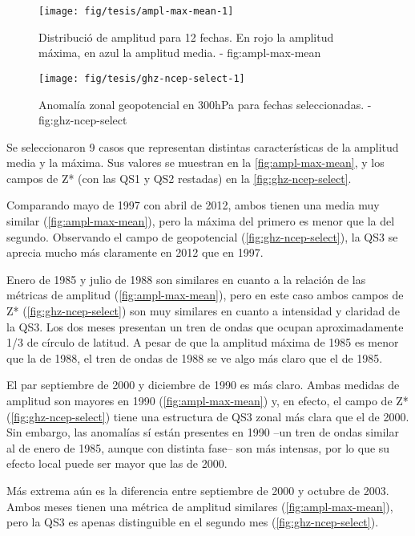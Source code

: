 \documentclass[spanish,a4paper]{book}
\begin{document}
\begin{figure*}
\texttt{[image: fig/tesis/ampl-max-mean-1]} \caption{Distribució de amplitud para 12 fechas. En rojo la amplitud máxima, en azul la amplitud media. - fig:ampl-max-mean}\label{fig:ampl-max-mean}
\end{figure*}

\begin{figure*}
\texttt{[image: fig/tesis/ghz-ncep-select-1]} \caption{Anomalía zonal geopotencial en 300hPa para fechas seleccionadas. - fig:ghz-ncep-select}\label{fig:ghz-ncep-select}
\end{figure*}

Se seleccionaron 9 casos que representan distintas características de la
amplitud media y la máxima. Sus valores se muestran en la
\autoref{fig:ampl-max-mean}, y los campos de Z* (con las QS1 y QS2
restadas) en la \autoref{fig:ghz-ncep-select}.

Comparando mayo de 1997 con abril de 2012, ambos tienen una media muy
similar (\autoref{fig:ampl-max-mean}), pero la máxima del primero es
menor que la del segundo. Observando el campo de geopotencial
(\autoref{fig:ghz-ncep-select}), la QS3 se aprecia mucho más claramente
en 2012 que en 1997.

Enero de 1985 y julio de 1988 son similares en cuanto a la relación de
las métricas de amplitud (\autoref{fig:ampl-max-mean}), pero en este
caso ambos campos de Z* (\autoref{fig:ghz-ncep-select}) son muy
similares en cuanto a intensidad y claridad de la QS3. Los dos meses
presentan un tren de ondas que ocupan aproximadamente 1/3 de círculo de
latitud. A pesar de que la amplitud máxima de 1985 es menor que la de
1988, el tren de ondas de 1988 se ve algo más claro que el de 1985.

El par septiembre de 2000 y diciembre de 1990 es más claro. Ambas
medidas de amplitud son mayores en 1990 (\autoref{fig:ampl-max-mean}) y,
en efecto, el campo de Z* (\autoref{fig:ghz-ncep-select}) tiene una
estructura de QS3 zonal más clara que el de 2000. Sin embargo, las
anomalías sí están presentes en 1990 --un tren de ondas similar al de
enero de 1985, aunque con distinta fase-- son más intensas, por lo que
su efecto local puede ser mayor que las de 2000.

Más extrema aún es la diferencia entre septiembre de 2000 y octubre de
2003. Ambos meses tienen una métrica de amplitud similares
(\autoref{fig:ampl-max-mean}), pero la QS3 es apenas distinguible en el
segundo mes (\autoref{fig:ghz-ncep-select}).
\end{document}
